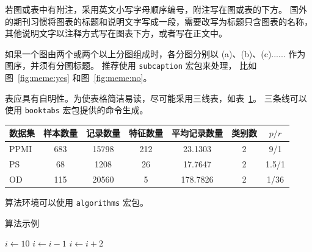 若图或表中有附注，采用英文小写字母顺序编号，附注写在图或表的下方。
国外的期刊习惯将图表的标题和说明文字写成一段，需要改写为标题只含图表的名称，其他说明文字以注释方式写在图表下方，或者写在正文中。

如果一个图由两个或两个以上分图组成时，各分图分别以 (a)、(b)、(c)...... 作为图序，并须有分图标题。
推荐使用 \texttt{subcaption} 宏包来处理， 比如图~\ref{fig:meme:yes} 和图~\ref{fig:meme:no}。



表应具有自明性。为使表格简洁易读，尽可能采用三线表，如表~\ref{tab:datasets}。
三条线可以使用 \texttt{booktabs} 宏包提供的命令生成。

\begin{table}[htbp]
\small
\centering
{}
\begin{tabular}{lcccccc}
\toprule
数据集 & 样本数量 & 记录数量 & 特征数量 & 平均记录数量 & 类别数 & $p/r$\\
\midrule
PPMI & 683 & 15798 & 212 & 23.1303 & 2 & 9/1 \\
PS & 68 & 1208 & 26 & 17.7647 & 2 & 1.5/1 \\
OD & 115 & 20560 & 5 & 178.7826 & 2 & 1/36 \\
\bottomrule
\end{tabular}
\label{tab:datasets}
\end{table}



算法环境可以使用 \texttt{algorithms} 宏包。

\begin{algorithm}[htbp]
\caption{算法示例}
\label{alg:cram_mult}
\begin{algorithmic}[1]
\State $i \gets 10$
    \State $i \gets i-1$
\Else
        \State $i \gets i+2$
    \EndIf
\EndIf
\end{algorithmic}
\end{algorithm}